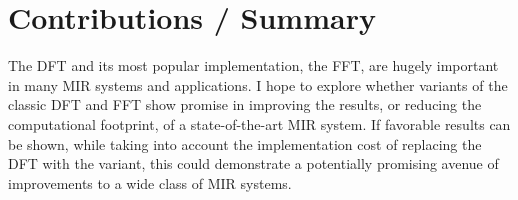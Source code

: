 \documentclass[letter,12pt]{scrartcl}
\begin{document}
\section{Contributions / Summary}

The DFT and its most popular implementation, the FFT, are hugely important in many MIR systems and applications. I hope to explore whether variants of the classic DFT and FFT show promise in improving the results, or reducing the computational footprint, of a state-of-the-art MIR system. If favorable results can be shown, while taking into account the implementation cost of replacing the DFT with the variant, this could demonstrate a potentially promising avenue of improvements to a wide class of MIR systems.

\vfill
\clearpage %

\printbibheading[title={References},heading=bibnumbered]
\printbibliography[heading=none]

\vfill
\clearpage %
\end{document}
